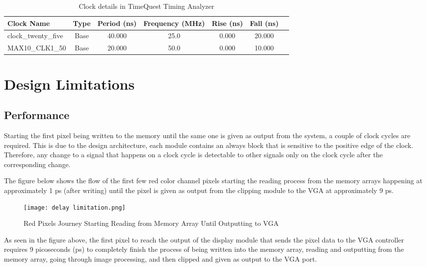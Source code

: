 \begin{table}[H]
	\centering
	\caption{Clock details in TimeQuest Timing Analyzer}
	\begin{tabularx}{0.75\linewidth}{lcccccc}
		\toprule
		\textbf{Clock Name} & \textbf{Type} & \textbf{Period (ns)} & \textbf{Frequency (MHz)} & \textbf{Rise (ns)} & \textbf{Fall (ns)} \\
		\midrule
		clock\_twenty\_five & Base & 40.000 & 25.0 & 0.000 & 20.000 \\
		MAX10\_CLK1\_50 & Base & 20.000 & 50.0 & 0.000 & 10.000 \\
		\bottomrule
	\end{tabularx}
\end{table}

\section{Design Limitations}
\subsection{Performance}
\par Starting the first pixel being written to the memory until the same one is given as output from the system, a couple of clock cycles are required. This is due to the design architecture, each module contains an always block that is sensitive to the positive edge of the clock. Therefore, any change to a signal that happens on a clock cycle is detectable to other signals only on the clock cycle after the corresponding change. \newline
\par The figure below shows the flow of the first few red color channel pixels starting the reading process from the memory arrays happening at approximately 1 ps (after writing) until the pixel is given as output from the clipping module to the VGA at approximately 9 ps. \newline

\begin{figure}[H]
	\centering
	\texttt{[image: delay limitation.png]}
	\caption{ Red Pixels Journey Starting Reading from Memory Array Until Outputting to VGA }
	\label{fig:limitationdelay}  
\end{figure}

\par As seen in the figure above, the first pixel to reach the output of the display module that sends the pixel data to the VGA controller requires 9 picoseconds (ps) to completely finish the process of being written into the memory array, reading and outputting from the memory array, going through image processing, and then clipped and given as output to the VGA port.  \newline


